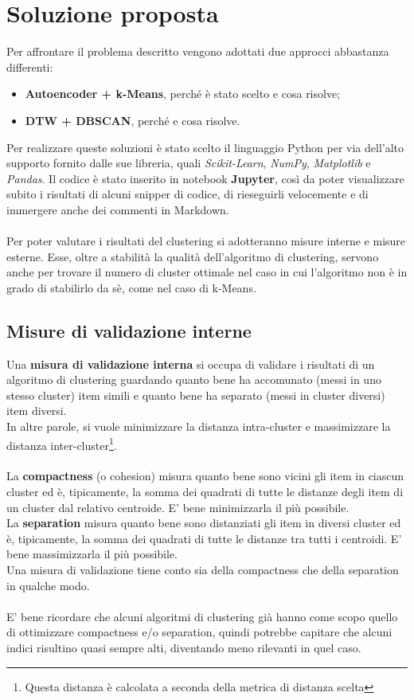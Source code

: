 \section{Soluzione proposta}
Per affrontare il problema descritto vengono adottati due approcci abbastanza differenti:
\begin{itemize}
	\item \textbf{Autoencoder + k-Means}, perché è stato scelto e cosa risolve;
	\item \textbf{DTW + DBSCAN}, perché e cosa risolve.
\end{itemize}
Per realizzare queste soluzioni è stato scelto il linguaggio Python per via dell'alto supporto fornito dalle sue libreria, quali \textit{Scikit-Learn}\cite{sklearn_api}, \textit{NumPy}\cite{numpy}, \textit{Matplotlib}\cite{matplotlib} e \textit{Pandas}\cite{pandas}. Il codice è stato inserito in notebook \textbf{Jupyter}, così da poter visualizzare subito i risultati di alcuni snipper di codice, di rieseguirli velocemente e di immergere anche dei commenti in Markdown.\\
\\
Per poter valutare i risultati del clustering si adotteranno misure interne e misure esterne\cite{metrics}. Esse, oltre a stabilità la qualità dell'algoritmo di clustering, servono anche per trovare il numero di cluster ottimale nel caso in cui l'algoritmo non è in grado di stabilirlo da sè, come nel caso di k-Means.

\subsection{Misure di validazione interne}
Una \textbf{misura di validazione interna} si occupa di validare i risultati di un algoritmo di clustering guardando quanto bene ha accomunato (messi in uno stesso cluster) item simili e quanto bene ha separato (messi in cluster diversi) item diversi.\\
In altre parole, si vuole minimizzare la distanza intra-cluster e massimizzare la distanza inter-cluster\footnote{Questa distanza è calcolata a seconda della metrica di distanza scelta}.\\
\\
La \textbf{compactness} (o cohesion) misura quanto bene sono vicini gli item in ciascun cluster ed è, tipicamente, la somma dei quadrati di tutte le distanze degli item di un cluster dal relativo centroide. E' bene minimizzarla il più possibile.\\
La \textbf{separation} misura quanto bene sono distanziati gli item in diversi cluster ed è, tipicamente, la somma dei quadrati di tutte le distanze tra tutti i centroidi. E' bene massimizzarla il più possibile.\\
Una misura di validazione tiene conto sia della compactness che della separation in qualche modo.\\
\\
E' bene ricordare che alcuni algoritmi di clustering già hanno come scopo quello di ottimizzare compactness e/o separation, quindi potrebbe capitare che alcuni indici risultino quasi sempre alti, diventando meno rilevanti in quel caso.


